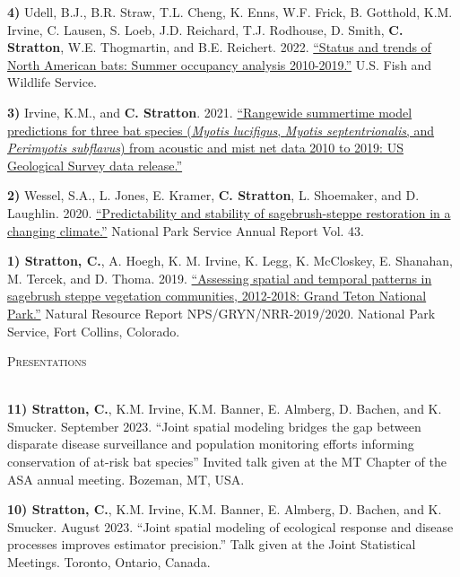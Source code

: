 \documentclass[a4paper]{article}
\newcommand{\lineunder} {
	\vspace*{-8pt} \\
	\hspace*{-18pt} \hrulefill \\
}
\newcommand{\header} [1] {
	{\hspace*{-18pt}\vspace*{6pt} \textcolor{Cerulean}{\textsc{#1}}}
	\vspace*{-6pt} \textcolor{Cerulean}{\lineunder}
}
\begin{document}
\textbf{4)} Udell, B.J., B.R. Straw, T.L. Cheng, K. Enns, W.F. Frick, B.
Gotthold, K.M. Irvine, C. Lausen, S. Loeb, J.D. Reichard, T.J. Rodhouse,
D. Smith, \textbf{C. Stratton}, W.E. Thogmartin, and B.E. Reichert.
2022. \href{https://doi.org/10.5066/P92JGACB}{``Status and trends of
North American bats: Summer occupancy analysis 2010-2019.''} U.S. Fish
and Wildlife Service. \vspace*{2mm}

\textbf{3)} Irvine, K.M., and \textbf{C. Stratton}. 2021.
\href{https://doi.org/10.5066/P9XZ8D6N.}{``Rangewide summertime model
predictions for three bat species (\textit{Myotis lucifigus},
\textit{Myotis septentrionalis}, and \textit{Perimyotis subflavus}) from
acoustic and mist net data 2010 to 2019: US Geological Survey data
release.''} \vspace*{2mm}

\textbf{2)} Wessel, S.A., L. Jones, E. Kramer, \textbf{C. Stratton}, L.
Shoemaker, and D. Laughlin. 2020.
\href{https://journals.uwyo.edu/index.php/uwnpsrc/article/view/6791/6301}{``Predictability
and stability of sagebrush-steppe restoration in a changing climate.''}
National Park Service Annual Report Vol. 43. \vspace*{2mm}

\textbf{1) Stratton, C.}, A. Hoegh, K. M. Irvine, K. Legg, K. McCloskey,
E. Shanahan, M. Tercek, and D. Thoma. 2019.
\href{https://irma.nps.gov/DataStore/DownloadFile/631136}{``Assessing
spatial and temporal patterns in sagebrush steppe vegetation
communities, 2012-2018: Grand Teton National Park.''} Natural Resource
Report NPS/GRYN/NRR-2019/2020. National Park Service, Fort Collins,
Colorado. \vspace*{2mm}

\header{Presentations}
\vspace*{2mm}

\textbf{11) Stratton, C.}, K.M. Irvine, K.M. Banner, E. Almberg, D.
Bachen, and K. Smucker. September 2023. ``Joint spatial modeling bridges
the gap between disparate disease surveillance and population monitoring
efforts informing conservation of at-risk bat species'' Invited talk
given at the MT Chapter of the ASA annual meeting. Bozeman, MT, USA.
\vspace*{2mm}

\textbf{10) Stratton, C.}, K.M. Irvine, K.M. Banner, E. Almberg, D.
Bachen, and K. Smucker. August 2023. ``Joint spatial modeling of
ecological response and disease processes improves estimator
precision.'' Talk given at the Joint Statistical Meetings. Toronto,
Ontario, Canada. \vspace*{2mm}
\end{document}
